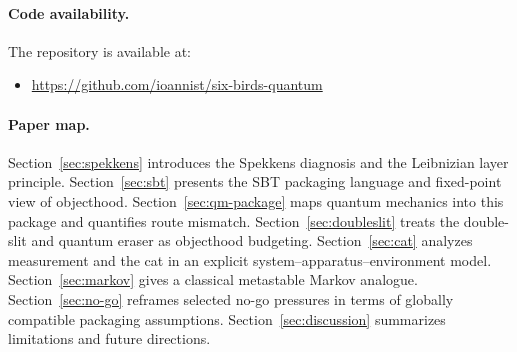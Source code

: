 \paragraph{Code availability.}
The repository is available at:
\begin{itemize}
  \item \url{https://github.com/ioannist/six-birds-quantum}
\end{itemize}

\paragraph{Paper map.}
Section~\ref{sec:spekkens} introduces the Spekkens diagnosis and the Leibnizian layer principle. Section~\ref{sec:sbt} presents the SBT packaging language and fixed-point view of objecthood. Section~\ref{sec:qm-package} maps quantum mechanics into this package and quantifies route mismatch. Section~\ref{sec:doubleslit} treats the double-slit and quantum eraser as objecthood budgeting. Section~\ref{sec:cat} analyzes measurement and the cat in an explicit system--apparatus--environment model. Section~\ref{sec:markov} gives a classical metastable Markov analogue. Section~\ref{sec:no-go} reframes selected no-go pressures in terms of globally compatible packaging assumptions. Section~\ref{sec:discussion} summarizes limitations and future directions.
